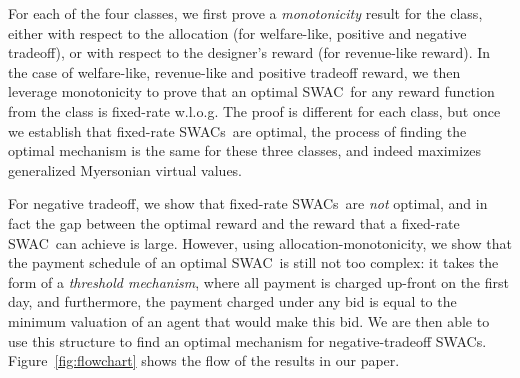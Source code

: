 \documentclass[11pt,letterpaper]{article}
\newcommand{\swac}{SWAC\xspace}
\newcommand{\swacs}{SWACs\xspace}
\theoremstyle{plain}
\begin{document}
{For each of the four classes,
we first prove a \emph{monotonicity} result for the class,
either with respect to the allocation (for welfare-like, positive and negative tradeoff), or with respect to the designer's reward (for revenue-like reward).
In the case of welfare-like, revenue-like and positive tradeoff reward, we then leverage monotonicity to prove that an optimal \swac\ for any reward function from the class is fixed-rate w.l.o.g. The proof is different for each class,
but once we establish that fixed-rate \swacs\ are optimal,
the process of finding the optimal mechanism is the same for these three classes, and indeed maximizes generalized Myersonian virtual values.


For negative tradeoff, we show that fixed-rate \swacs\ are \emph{not} optimal,
and in fact the gap between the optimal reward and the reward that a fixed-rate \swac\ can achieve is large. However, using allocation-monotonicity,
we show that the payment schedule of an optimal \swac\ is still not too complex: it takes the form of a \emph{threshold mechanism},
where all payment is charged up-front on the first day, and furthermore, the payment charged under any bid is equal to the minimum valuation of an agent that would make this bid.
We are then able to use this structure to find an optimal mechanism for negative-tradeoff \swacs.
Figure~\ref{fig:flowchart} shows the flow of the results in our paper.
}




\end{document}

